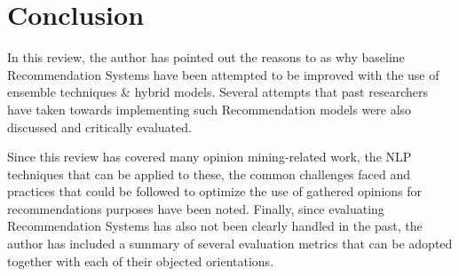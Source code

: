 \documentclass[manuscript,screen,review]{acmart}
\begin{document}
\section{Conclusion}
In this review, the author has pointed out the reasons to as why baseline Recommendation Systems have been attempted to be improved with the use of ensemble techniques \& hybrid models. Several attempts that past researchers have taken towards implementing such Recommendation models were also discussed and critically evaluated.

Since this review has covered many opinion mining-related work, the NLP techniques that can be applied to these, the common challenges faced and practices that could be followed to optimize the use of gathered opinions for recommendations purposes have been noted. Finally, since evaluating Recommendation Systems has also not been clearly handled in the past, the author has included a summary of several evaluation metrics that can be adopted together with each of their objected orientations.





\end{document}
